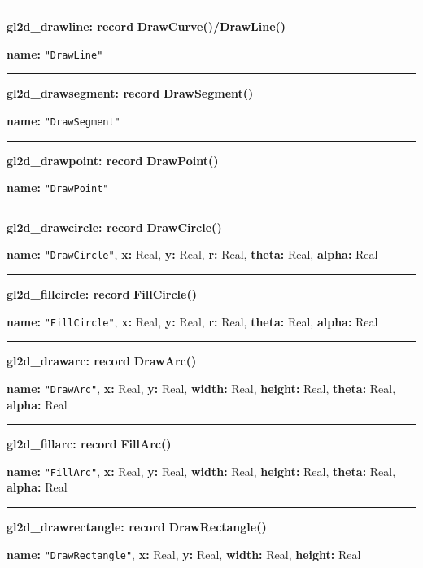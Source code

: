 \documentclass[letterpaper,12pt]{article}
\begin{document}
\bigskip\hrule\vspace{0.1cm}
\noindent
{\bf gl2d\_drawline: record} \hfill {\bf DrawCurve()/DrawLine()} 

{\bf name:} \texttt{"DrawLine"}

\bigskip\hrule\vspace{0.1cm}
\noindent
{\bf gl2d\_drawsegment: record} \hfill {\bf DrawSegment()} 

{\bf name:} \texttt{"DrawSegment"}

\bigskip\hrule\vspace{0.1cm}
\noindent
{\bf gl2d\_drawpoint: record} \hfill {\bf DrawPoint()} 

{\bf name:} \texttt{"DrawPoint"}

\bigskip\hrule\vspace{0.1cm}
\noindent
{\bf gl2d\_drawcircle: record} \hfill {\bf DrawCircle()} 

{\bf name:} \texttt{"DrawCircle"},\newline\indent
{\bf x:} Real,
{\bf y:} Real,
{\bf r:} Real,
{\bf theta:} Real,
{\bf alpha:} Real

\bigskip\hrule\vspace{0.1cm}
\noindent
{\bf gl2d\_fillcircle: record} \hfill {\bf FillCircle()} 

{\bf name:} \texttt{"FillCircle"},\newline\indent
{\bf x:} Real,
{\bf y:} Real,
{\bf r:} Real,
{\bf theta:} Real,
{\bf alpha:} Real

\bigskip\hrule\vspace{0.1cm}
\noindent
{\bf gl2d\_drawarc: record} \hfill {\bf DrawArc()} 

{\bf name:} \texttt{"DrawArc"},\newline\indent
{\bf x:} Real,
{\bf y:} Real,
{\bf width:} Real,
{\bf height:} Real,
{\bf theta:} Real,
{\bf alpha:} Real

\bigskip\hrule\vspace{0.1cm}
\noindent
{\bf gl2d\_fillarc: record} \hfill {\bf FillArc()}

{\bf name:} \texttt{"FillArc"},\newline\indent
{\bf x:} Real,
{\bf y:} Real,
{\bf width:} Real,
{\bf height:} Real,
{\bf theta:} Real,
{\bf alpha:} Real

\bigskip\hrule\vspace{0.1cm}
\noindent
{\bf gl2d\_drawrectangle: record} \hfill {\bf DrawRectangle()}

{\bf name:} \texttt{"DrawRectangle"},\newline\indent
{\bf x:} Real,
{\bf y:} Real,
{\bf width:} Real,
{\bf height:} Real
\end{document}
